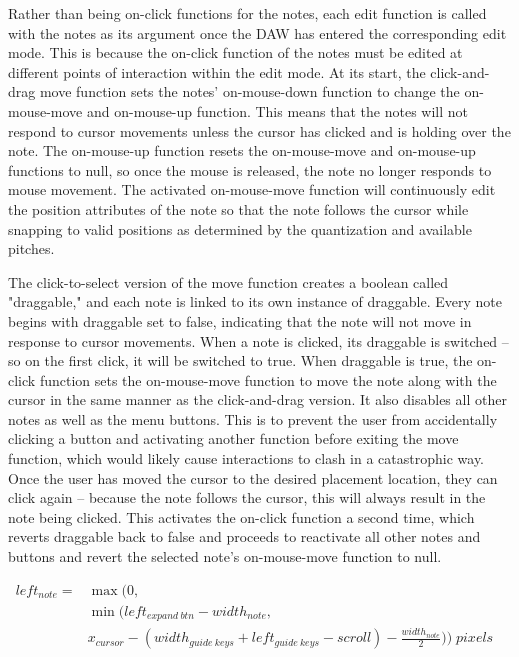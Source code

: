 Rather than being on-click functions for the notes, each edit function is called with the notes as
its argument once the DAW has entered the corresponding edit mode. This is because the on-click
function of the notes must be edited at different points of interaction within the edit mode. At
its start, the click-and-drag move function sets the notes' on-mouse-down function to change the
on-mouse-move and on-mouse-up function. This means that the notes will not respond to cursor
movements unless the cursor has clicked and is holding over the note. The on-mouse-up function
resets the on-mouse-move and on-mouse-up functions to null, so once the mouse is released, the note
no longer responds to mouse movement. The activated on-mouse-move function will continuously edit
the position attributes of the note so that the note follows the cursor while snapping to valid
positions as determined by the quantization and available pitches.

The click-to-select version of the move function creates a boolean called "draggable," and each
note is linked to its own instance of draggable. Every note begins with draggable set to false,
indicating that the note will not move in response to cursor movements. When a note is clicked, its
draggable is switched – so on the first click, it will be switched to true. When draggable is true,
the on-click function sets the on-mouse-move function to move the note along with the cursor in the
same manner as the click-and-drag version. It also disables all other notes as well as the menu
buttons. This is to prevent the user from accidentally clicking a button and activating another
function before exiting the move function, which would likely cause interactions to clash in a
catastrophic way. Once the user has moved the cursor to the desired placement location, they can
click again – because the note follows the cursor, this will always result in the note being
clicked. This activates the on-click function a second time, which reverts draggable back to false
and proceeds to reactivate all other notes and buttons and revert the selected note’s on-mouse-move
function to null.

\begin{align} \label{move_horz}
  left_{note} = & \max(0,                                                                                                \\
                & \min(left_{expand\:btn} - width_{note},                                                                \\
                & x_{cursor} - (width_{guide\:keys} + left_{guide\:keys} - scroll) - \frac{width_{note}}{2})) \;pixels &
\end{align}

